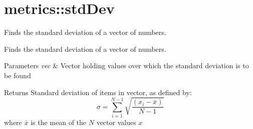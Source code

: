 \hypertarget{group__stdDev}{}\section{metrics\+:\+:std\+Dev}
\label{group__stdDev}


Finds the standard deviation of a vector of numbers.  


Finds the standard deviation of a vector of numbers. 


\begin{DoxyParams}{Parameters}
{\em vec} & Vector holding values over which the standard deviation is to be found \\
\hline
\end{DoxyParams}
\begin{DoxyReturn}{Returns}
Standard deviation of items in vector, as defined by\+: \[ \sigma = \sum_{i=1}^{N-1}\sqrt{\frac{(x_i-\bar{x})}{N - 1}} \] where $\bar{x}$ is the mean of the $N$ vector values $x$ 
\end{DoxyReturn}
